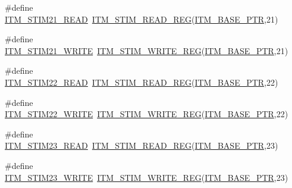 \begin{DoxyCompactItemize}
\item 
\#define \hyperlink{group___i_t_m___register___accessor___macros_ga5e2870c6c2d38a75f0477a1030fc60aa}{I\+T\+M\+\_\+\+S\+T\+I\+M21\+\_\+\+R\+E\+AD}~\hyperlink{group___i_t_m___register___accessor___macros_ga5009882336aadcd4f37b45cf3395c450}{I\+T\+M\+\_\+\+S\+T\+I\+M\+\_\+\+R\+E\+A\+D\+\_\+\+R\+EG}(\hyperlink{group___i_t_m___peripheral_gafaddee8fe8b6a898d4e5edc43ee0d703}{I\+T\+M\+\_\+\+B\+A\+S\+E\+\_\+\+P\+TR},21)
\item 
\#define \hyperlink{group___i_t_m___register___accessor___macros_gac7f186c8addcf22a51326064a6775a33}{I\+T\+M\+\_\+\+S\+T\+I\+M21\+\_\+\+W\+R\+I\+TE}~\hyperlink{group___i_t_m___register___accessor___macros_ga049ca92a4e78e77c19af81e51aa73f1c}{I\+T\+M\+\_\+\+S\+T\+I\+M\+\_\+\+W\+R\+I\+T\+E\+\_\+\+R\+EG}(\hyperlink{group___i_t_m___peripheral_gafaddee8fe8b6a898d4e5edc43ee0d703}{I\+T\+M\+\_\+\+B\+A\+S\+E\+\_\+\+P\+TR},21)
\item 
\#define \hyperlink{group___i_t_m___register___accessor___macros_ga65cc639289ac0f598f937c573ed5abde}{I\+T\+M\+\_\+\+S\+T\+I\+M22\+\_\+\+R\+E\+AD}~\hyperlink{group___i_t_m___register___accessor___macros_ga5009882336aadcd4f37b45cf3395c450}{I\+T\+M\+\_\+\+S\+T\+I\+M\+\_\+\+R\+E\+A\+D\+\_\+\+R\+EG}(\hyperlink{group___i_t_m___peripheral_gafaddee8fe8b6a898d4e5edc43ee0d703}{I\+T\+M\+\_\+\+B\+A\+S\+E\+\_\+\+P\+TR},22)
\item 
\#define \hyperlink{group___i_t_m___register___accessor___macros_ga7733147e8939d83fbea163a3d3c181d4}{I\+T\+M\+\_\+\+S\+T\+I\+M22\+\_\+\+W\+R\+I\+TE}~\hyperlink{group___i_t_m___register___accessor___macros_ga049ca92a4e78e77c19af81e51aa73f1c}{I\+T\+M\+\_\+\+S\+T\+I\+M\+\_\+\+W\+R\+I\+T\+E\+\_\+\+R\+EG}(\hyperlink{group___i_t_m___peripheral_gafaddee8fe8b6a898d4e5edc43ee0d703}{I\+T\+M\+\_\+\+B\+A\+S\+E\+\_\+\+P\+TR},22)
\item 
\#define \hyperlink{group___i_t_m___register___accessor___macros_gaa2155b2b5a6c7d6a8a3cc643a4bd4af6}{I\+T\+M\+\_\+\+S\+T\+I\+M23\+\_\+\+R\+E\+AD}~\hyperlink{group___i_t_m___register___accessor___macros_ga5009882336aadcd4f37b45cf3395c450}{I\+T\+M\+\_\+\+S\+T\+I\+M\+\_\+\+R\+E\+A\+D\+\_\+\+R\+EG}(\hyperlink{group___i_t_m___peripheral_gafaddee8fe8b6a898d4e5edc43ee0d703}{I\+T\+M\+\_\+\+B\+A\+S\+E\+\_\+\+P\+TR},23)
\item 
\#define \hyperlink{group___i_t_m___register___accessor___macros_gaca71beb45d1448267f6f0f4ae952ce42}{I\+T\+M\+\_\+\+S\+T\+I\+M23\+\_\+\+W\+R\+I\+TE}~\hyperlink{group___i_t_m___register___accessor___macros_ga049ca92a4e78e77c19af81e51aa73f1c}{I\+T\+M\+\_\+\+S\+T\+I\+M\+\_\+\+W\+R\+I\+T\+E\+\_\+\+R\+EG}(\hyperlink{group___i_t_m___peripheral_gafaddee8fe8b6a898d4e5edc43ee0d703}{I\+T\+M\+\_\+\+B\+A\+S\+E\+\_\+\+P\+TR},23)

\end{DoxyCompactItemize}
